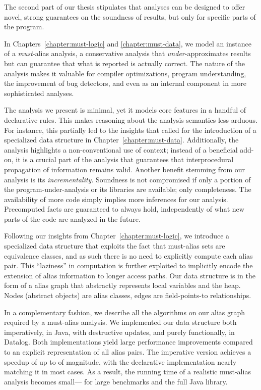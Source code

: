 The second part of our thesis stipulates that analyses can be designed to offer novel, strong guarantees on the soundness of results, but only for specific parts of the program.

In Chapters~\ref{chapter:must-logic} and \ref{chapter:must-data}, we model an instance of a \emph{must}-alias analysis, a conservative analysis that \emph{under}-approximates results but can guarantee that what is reported is actually correct. The nature of the analysis makes it valuable for compiler optimizations, program understanding, the improvement of bug detectors, and even as an internal component in more sophisticated analyses.

The analysis we present is minimal, yet it models core features in a handful of declarative rules. This makes reasoning about the analysis semantics less arduous. For instance, this partially led to the insights that called for the introduction of a specialized data structure in Chapter~\ref{chapter:must-data}. Additionally, the analysis highlights a non-conventional use of context; instead of a beneficial add-on, it is a crucial part of the analysis that guarantees that interprocedural propagation of information remains valid. Another benefit stemming from our analysis is its \emph{incrementality}. Soundness is not compromised if only a portion of the program-under-analysis or its libraries are available; only completeness. The availability of more code simply implies more inferences for our analysis. Precomputed facts are guaranteed to always hold, independently of what new parts of the code are analyzed in the future.

Following our insights from Chapter~\ref{chapter:must-logic}, we introduce a specialized data structure that exploits the fact that must-alias sets are equivalence classes, and as such there is no need to explicitly compute each alias pair. This ``laziness'' in computation is further exploited to implicitly encode the extension of alias information to longer access paths. Our data structure is in the form of a alias graph that abstractly represents local variables and the heap. Nodes (abstract objects) are alias classes, edges are field-points-to relationships.

In a complementary fashion, we describe all the algorithms on our alias graph required by a must-alias analysis. We implemented our data structure both imperatively, in Java, with destructive updates, and purely functionally, in Datalog. Both implementations yield large performance improvements compared to an explicit representation of all alias pairs. The imperative version achieves a speedup of up to  of magnitude, with the declarative implementation nearly matching it in most cases. As a result, the running time of a realistic must-alias analysis becomes small--- for large benchmarks and the full Java library.

